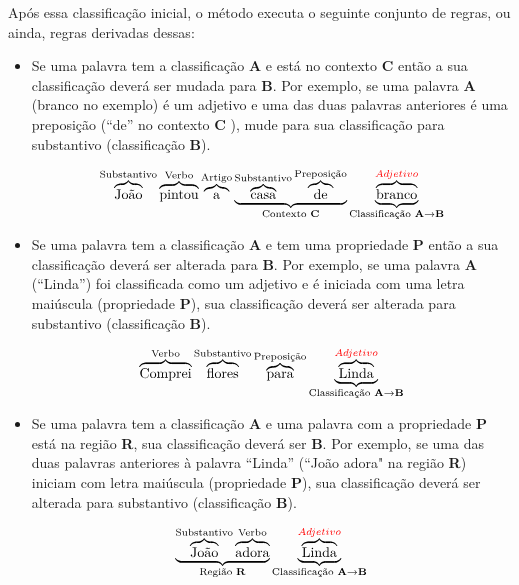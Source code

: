 Após essa classificação inicial, o método executa o seguinte conjunto de
regras, ou ainda, regras derivadas dessas:

\begin{itemize}
  \item Se uma palavra tem a classificação \textbf{A} e está no contexto
  \textbf{C} então a sua classificação deverá ser mudada para \textbf{B}. Por
  exemplo, se uma palavra \textbf{A} (branco no exemplo) é um adjetivo e uma das
  duas palavras anteriores é uma preposição (``de'' no contexto \textbf{C}
  ), mude para sua classificação para substantivo (classificação \textbf{B}).
  
  \[\overbrace{\text{João}}^\text{Substantivo}
  \overbrace{\text{pintou}}^\text{Verbo}
  \overbrace{\text{a}}^\text{Artigo}
  \underbrace{
  \overbrace{\text{casa}}^\text{Substantivo}
  \overbrace{\text{de}}^\text{Preposição}}_\text{Contexto \textbf{C}}
  \underbrace{\overbrace{\text{branco}}^{\textcolor{red}{Adjetivo}}}_\text{Classificação
  \textbf{A}\textrightarrow\textbf{B}}
  \]
  
  \item Se uma palavra tem a classificação \textbf{A} e tem uma propriedade
  \textbf{P} então a sua classificação deverá ser alterada para \textbf{B}. Por
  exemplo, se uma palavra \textbf{A} (``Linda'') foi classificada como um
  adjetivo e é iniciada com uma letra maiúscula (propriedade \textbf{P}), sua
  classificação deverá ser alterada para substantivo (classificação \textbf{B}).
  
  \[\overbrace{\text{Comprei}}^\text{Verbo}
  \overbrace{\text{flores}}^\text{Substantivo}
  \overbrace{\text{para}}^\text{Preposição}
  \underbrace{\overbrace{\text{L}\text{inda}}^{\textcolor{red}{Adjetivo}}}_\text{Classificação
  \textbf{A}\textrightarrow\textbf{B}}
  \]
  
  \item Se uma palavra tem a classificação \textbf{A} e uma palavra com a
  propriedade \textbf{P} está na região \textbf{R}, sua classificação deverá
  ser \textbf{B}. Por exemplo, se uma das duas palavras anteriores à palavra
  ``Linda'' (``João adora" na região \textbf{R}) iniciam com letra maiúscula
  (propriedade \textbf{P}), sua classificação deverá ser alterada para substantivo (classificação \textbf{B}).
  
  \[\underbrace{\overbrace{\text{João}}^\text{Substantivo}
  \overbrace{\text{adora}}^\text{Verbo}}_\text{Região \textbf{R}}
  \underbrace{\overbrace{\text{L}\text{inda}}^{\textcolor{red}{Adjetivo}}}_\text{Classificação
  \textbf{A}\textrightarrow\textbf{B}}
  \]
  
  
\end{itemize}

